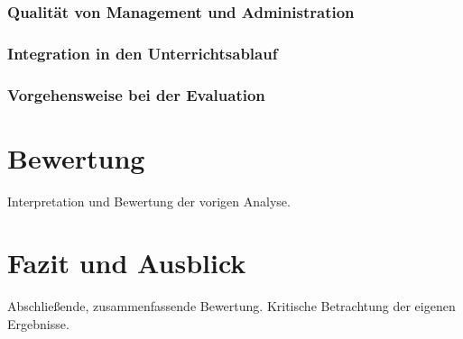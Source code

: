 \documentclass[conference]{IEEEtran}
\begin{document}
\subsubsection{Qualität von Management und Administration}
\subsubsection{Integration in den Unterrichtsablauf}
\subsubsection{Vorgehensweise bei der Evaluation}

\section{Bewertung}
Interpretation und Bewertung der vorigen Analyse.


\section{Fazit und Ausblick}
Abschließende, zusammenfassende Bewertung. Kritische Betrachtung der eigenen Ergebnisse.





\end{document}

